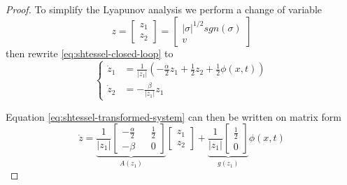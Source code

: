\begin{proof}%
To simplify the Lyapunov analysis we perform a change of variable
    \begin{equation*}
        z = \begin{bmatrix}
        z_1 \\ z_2 
        \end{bmatrix}
        = \begin{bmatrix}
        |\sigma|^{1/2}sgn(\sigma) \\ v
        \end{bmatrix}
    \end{equation*}
    then rewrite \eqref{eq:shtessel-closed-loop} to 
    \begin{equation}
        \begin{cases}
        \dot{z}_1 &= \frac{1}{|z_1|}\left(-\frac{\alpha}{2}z_1 + \frac{1}{2}z_2 + \frac{1}{2}\phi(x,t)\right) \\
        \dot{z}_2 &= -\frac{\beta}{|z_1|}z_1
        \end{cases}
        \label{eq:shtessel-transformed-system}
    \end{equation}

    Equation \eqref{eq:shtessel-transformed-system} can then be written on matrix form
        \begin{equation}
          \dot{z} = 
          \underbrace{
            \frac{1}{|z_1|}
          \begin{bmatrix}
            -\frac{\alpha}{2} && \frac{1}{2} \\ 
            -\beta && 0
          \end{bmatrix}
          }_{A(z_1)}
          \begin{bmatrix}
            z_1 \\ z_2 
          \end{bmatrix}
          +
          \underbrace{
            \frac{1}{|z_1|}
          \begin{bmatrix}
            \frac{1}{2} \\ 0
          \end{bmatrix} 
          }_{g(z_1)}
          \phi(x, t)
        \end{equation}


\end{proof}
